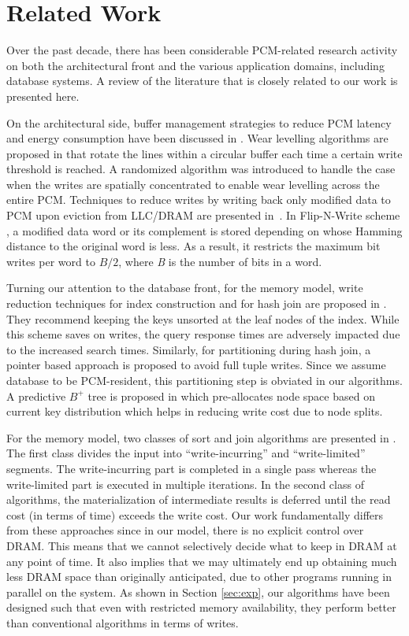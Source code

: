 \section{Related Work}
\label{relWork}
Over the past decade, there has been considerable PCM-related research
activity on both the architectural front and the various application
domains, including database systems. A review of the literature that is
closely related to our work is presented here.

On the architectural side, buffer management strategies to reduce PCM
latency and energy consumption have been discussed in \cite{lee}. Wear
levelling algorithms are proposed in \cite{wear} that rotate the lines
within a circular buffer each time a certain write threshold is reached. A
randomized algorithm was introduced to handle the case when the writes
are spatially concentrated to enable wear levelling across the entire
PCM. Techniques to reduce writes by writing back only modified data to PCM
upon eviction from LLC/DRAM are presented in~\cite{qureshi,write,lee,zhou}. 
In Flip-N-Write scheme \cite{flipnwrite}, a modified data word
or its complement is stored depending on whose Hamming distance to the
original word is less. As a result, it restricts the maximum bit writes
per word to $B/2$, where \textit{B} is the number of bits in a word.

Turning our attention to the database front, for
the \modelPcmRam{} memory model, write reduction techniques for index
construction and for hash join are proposed in \cite{chen}. They recommend
keeping the keys unsorted at the leaf nodes of the index. While this
scheme saves on writes, the query response times are adversely impacted
due to the increased search times.  Similarly, for partitioning during
hash join, a pointer based approach is proposed to avoid full tuple
writes. Since we assume database to be PCM-resident, this partitioning
step is obviated in our algorithms. A predictive $B^+$ tree is proposed in \cite{hupredictive} 
which pre-allocates node space based on current key distribution which 
helps in reducing write cost due to node splits.

For the \modelExplicit{} memory model, two classes of sort and
join algorithms are presented in \cite{viglas}.  The first class
divides the input into ``write-incurring'' and ``write-limited''
segments. The write-incurring part is completed in a single pass
whereas the write-limited part is executed in multiple iterations.
In the second class of algorithms, the materialization of intermediate
results is deferred until the read cost (in terms of time) exceeds
the write cost.  Our work fundamentally differs from these approaches
since in our \model{} model, there is no explicit control over DRAM.
This means that we cannot selectively decide what to keep in DRAM at any
point of time. It also implies that we may ultimately end up obtaining
much less DRAM space than originally anticipated, due to other programs
running in parallel on the system. As shown in Section \ref{sec:exp},
our algorithms have been designed such that even with restricted memory
availability, they perform better than conventional algorithms in terms
of writes. 

